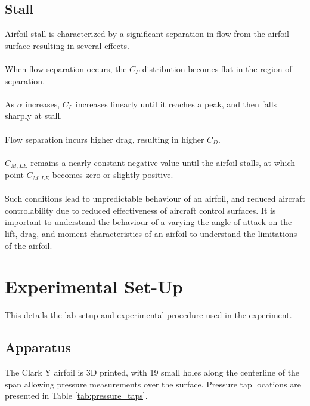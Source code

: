 \documentclass[runningheads]{llncs}
\begin{document}
\subsection{Stall}
Airfoil stall is characterized by a significant separation in flow from the airfoil surface resulting in several effects.\\
\\
When flow separation occurs, the $C_P$ distribution becomes flat in the region of separation.\\
\\
As $\alpha$ increases, $C_L$ increases linearly until it reaches a peak, and then falls sharply at stall.\\
\\
Flow separation incurs higher drag, resulting in higher $C_D$.\\
\\
$C_{M, LE}$ remains a nearly constant negative value until the airfoil stalls, at which point $C_{M, LE}$ becomes zero or slightly positive.\\
\\
Such conditions lead to unpredictable behaviour of an airfoil, and reduced aircraft controlability due to reduced effectiveness of aircraft control surfaces. It is important to understand the behaviour of a varying the angle of attack on the lift, drag, and moment characteristics of an airfoil to understand the limitations of the airfoil.





\section{Experimental Set-Up}

This details the lab setup and experimental procedure used in the experiment.

\subsection{Apparatus}

The Clark Y airfoil is 3D printed, with 19 small holes along the centerline of the span allowing pressure measurements over the surface. Pressure tap locations are presented in Table \ref{tab:pressure_taps}.
\end{document}
